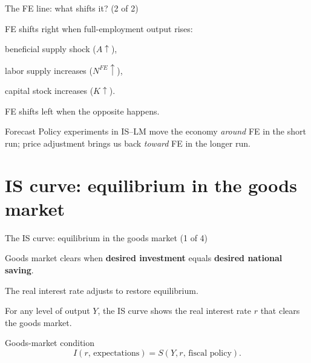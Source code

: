 \documentclass[aspectratio=169,xcolor=dvipsnames]{beamer}
\let\tempone\itemize
\let\temptwo\enditemize
\renewenvironment{itemize}{\tempone\addtolength{\itemsep}{\fill}}{\temptwo}
\begin{document}
\begin{frame}{The FE line: what shifts it? (2 of 2)}
\begin{itemize}
\item FE shifts right when full-employment output rises:
\begin{itemize}
\item beneficial supply shock ($A\uparrow$),
\item labor supply increases ($N^{FE}\uparrow$),
\item capital stock increases ($K\uparrow$).
\end{itemize}
\item FE shifts left when the opposite happens.
\end{itemize}

\begin{block}{Forecast}
Policy experiments in IS--LM move the economy \emph{around} FE in the short run; price adjustment brings us back \emph{toward} FE in the longer run.
\end{block}
\end{frame}

\section{IS curve: equilibrium in the goods market}

\begin{frame}{The IS curve: equilibrium in the goods market (1 of 4)}
\begin{itemize}
\item Goods market clears when \textbf{desired investment} equals \textbf{desired national saving}.
\item The real interest rate adjusts to restore equilibrium.
\item For any level of output $Y$, the IS curve shows the real interest rate $r$ that clears the goods market.
\end{itemize}

\begin{block}{Goods-market condition}
\[
I(r,\,\text{expectations}) = S(Y,r,\,\text{fiscal policy}).
\]
\end{block}
\end{frame}
\end{document}
